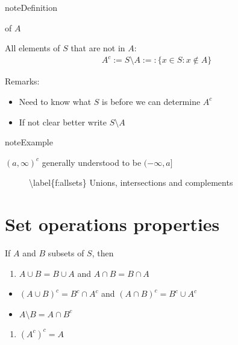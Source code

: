 \documentclass[letterpaper,10pt,english]{jupyterBook}
\begin{document}
\begin{sphinxadmonition}{note}{Definition}

\sphinxAtStartPar
{} of \(A\)

\sphinxAtStartPar
All elements of \(S\) that are not in \(A\):
\begin{equation*}
\begin{split}
A^c := S \setminus A :=: \{ x \in S : x \notin A \}
\end{split}
\end{equation*}\end{sphinxadmonition}

\sphinxAtStartPar
Remarks:
\begin{itemize}
\item {} 
\sphinxAtStartPar
Need to know what \(S\) is before we can determine \(A^c\)

\item {} 
\sphinxAtStartPar
If not clear better write \(S \setminus A\)

\end{itemize}

\begin{sphinxadmonition}{note}{Example}

\sphinxAtStartPar
\((a,\infty)^c\) generally understood to be \((-\infty, a]\)
\end{sphinxadmonition}

\begin{figure}[htbp]
\centering
\capstart

\noindent{}
\caption{\textbackslash{}label\{f:allsets\} Unions, intersections and complements}\label{\detokenize{03.set_theory:allsets}}\end{figure}


\section{Set operations properties}
\label{\detokenize{03.set_theory:set-operations-properties}}
\sphinxAtStartPar
If \(A\) and \(B\) subsets of \(S\), then
\begin{enumerate}
%
\item {} 
\sphinxAtStartPar
\(A \cup B = B \cup A\) and \(A \cap B = B \cap A\)

\end{enumerate}
\begin{itemize}
\item {} 
\sphinxAtStartPar
\((A \cup B)^c = B^c \cap A^c\) and \((A \cap B)^c = B^c \cup A^c\)

\item {} 
\sphinxAtStartPar
\(A \setminus B = A \cap B^c\)

\end{itemize}
\begin{enumerate}
%
\setcounter{enumi}{8}
\item {} 
\sphinxAtStartPar
\((A^c)^c = A\)

\end{enumerate}
\end{document}
